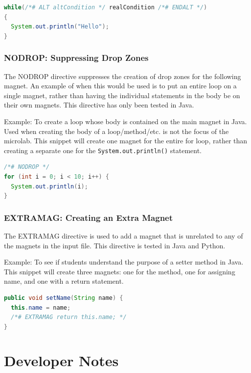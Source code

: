 \documentclass[letter,10pt,final]{article}
\begin{document}
\begin{lstlisting}[language=Java]
while(/*# ALT altCondition */ realCondition /*# ENDALT */) 
{
  System.out.println("Hello");
}
\end{lstlisting}


\subsubsection{NODROP: Suppressing Drop Zones}

The NODROP directive suppresses the creation of drop zones for the 
following magnet. An example of when this would be used is to put an 
entire loop on a single magnet, rather than having the individual 
statements in the body be on their own magnets. This directive has only 
been tested in Java. 

Example: To create a loop whose body is contained on the main magnet in 
Java. Used when creating the body of a loop/method/etc. is not the 
focus of the microlab. This snippet will create one magnet for the 
entire for loop, rather than creating a separate one for the 
\verb~System.out.println()~ statement.

\begin{lstlisting}[language=Java]
/*# NODROP */
for (int i = 0; i < 10; i++) {
  System.out.println(i);
}
\end{lstlisting}

\subsubsection{EXTRAMAG: Creating an Extra Magnet}

The EXTRAMAG directive is used to add a magnet that is unrelated to any 
of the magnets in the input file. This directive is tested in Java and 
Python.  

Example: To see if students understand the purpose of a setter method 
in Java. This snippet will create three magnets: one for the method, 
one for assigning name, and one with a return statement.
\begin{lstlisting}[language=Java]
public void setName(String name) {
  this.name = name;
  /*# EXTRAMAG return this.name; */
}
\end{lstlisting}


\section{Developer Notes}
\end{document}
